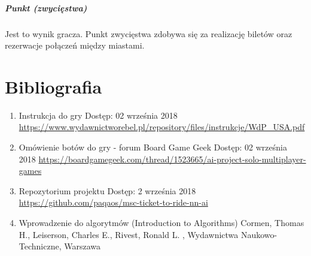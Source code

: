 \documentclass[12pt, oneside]{report}
\begin{document}
\paragraph{Punkt (zwycięstwa)} Jest to wynik gracza. Punkt zwycięstwa zdobywa się za realizację biletów oraz rezerwacje połączeń między miastami.
\chapter{Bibliografia}
\begin{enumerate}
	\item{Instrukcja do gry}
	\subitem Dostęp: 02 września 2018
	\subitem \url{https://www.wydawnictworebel.pl/repository/files/instrukcje/WdP_USA.pdf}
	\item{Omówienie botów do gry - forum Board Game Geek}
	\subitem Dostęp: 02 września 2018
	\subitem \url{https://boardgamegeek.com/thread/1523665/ai-project-solo-multiplayer-games}
	\item{Repozytorium projektu}
	\subitem Dostęp: 2 września 2018
	\subitem \url{https://github.com/paqaos/msc-ticket-to-ride-nn-ai}
	\item{Wprowadzenie do algorytmów (Introduction to Algorithms)}
	\subitem Cormen, Thomas H., Leiserson, Charles E., Rivest, Ronald L.
	, Wydawnictwa Naukowo-Techniczne, Warszawa
\end{enumerate}
\listoffigures
\listoftables
\end{document}
